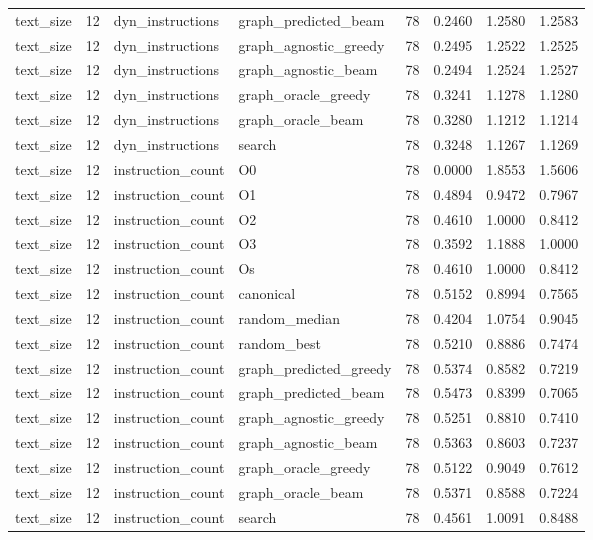 \begin{table}[t]
\begin{tabular}{lrllrrrr}
text\_size & 12 & dyn\_instructions & graph\_predicted\_beam & 78 & 0.2460 & 1.2580 & 1.2583 \\
text\_size & 12 & dyn\_instructions & graph\_agnostic\_greedy & 78 & 0.2495 & 1.2522 & 1.2525 \\
text\_size & 12 & dyn\_instructions & graph\_agnostic\_beam & 78 & 0.2494 & 1.2524 & 1.2527 \\
text\_size & 12 & dyn\_instructions & graph\_oracle\_greedy & 78 & 0.3241 & 1.1278 & 1.1280 \\
text\_size & 12 & dyn\_instructions & graph\_oracle\_beam & 78 & 0.3280 & 1.1212 & 1.1214 \\
text\_size & 12 & dyn\_instructions & search & 78 & 0.3248 & 1.1267 & 1.1269 \\
text\_size & 12 & instruction\_count & O0 & 78 & 0.0000 & 1.8553 & 1.5606 \\
text\_size & 12 & instruction\_count & O1 & 78 & 0.4894 & 0.9472 & 0.7967 \\
text\_size & 12 & instruction\_count & O2 & 78 & 0.4610 & 1.0000 & 0.8412 \\
text\_size & 12 & instruction\_count & O3 & 78 & 0.3592 & 1.1888 & 1.0000 \\
text\_size & 12 & instruction\_count & Os & 78 & 0.4610 & 1.0000 & 0.8412 \\
text\_size & 12 & instruction\_count & canonical & 78 & 0.5152 & 0.8994 & 0.7565 \\
text\_size & 12 & instruction\_count & random\_median & 78 & 0.4204 & 1.0754 & 0.9045 \\
text\_size & 12 & instruction\_count & random\_best & 78 & 0.5210 & 0.8886 & 0.7474 \\
text\_size & 12 & instruction\_count & graph\_predicted\_greedy & 78 & 0.5374 & 0.8582 & 0.7219 \\
text\_size & 12 & instruction\_count & graph\_predicted\_beam & 78 & 0.5473 & 0.8399 & 0.7065 \\
text\_size & 12 & instruction\_count & graph\_agnostic\_greedy & 78 & 0.5251 & 0.8810 & 0.7410 \\
text\_size & 12 & instruction\_count & graph\_agnostic\_beam & 78 & 0.5363 & 0.8603 & 0.7237 \\
text\_size & 12 & instruction\_count & graph\_oracle\_greedy & 78 & 0.5122 & 0.9049 & 0.7612 \\
text\_size & 12 & instruction\_count & graph\_oracle\_beam & 78 & 0.5371 & 0.8588 & 0.7224 \\
text\_size & 12 & instruction\_count & search & 78 & 0.4561 & 1.0091 & 0.8488 \\

\end{tabular}
\end{table}
